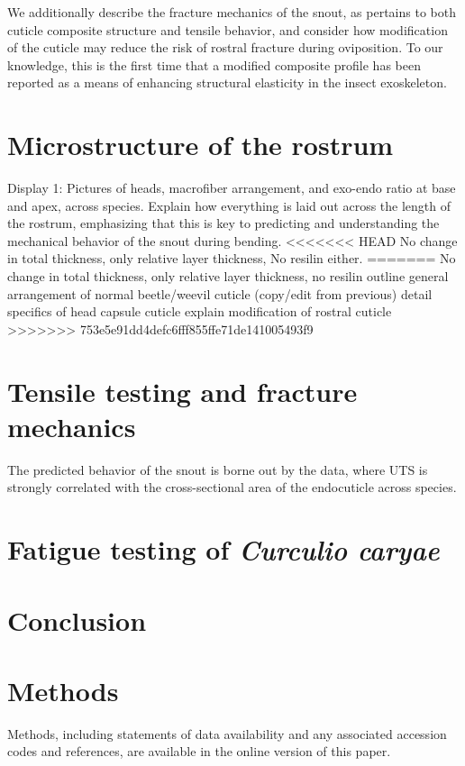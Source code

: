 \documentclass[twocolumn, linenumbers, superscriptaddress]{revtex4-1}
\begin{document}
	We additionally describe the fracture mechanics of the snout, as pertains to both cuticle composite structure and tensile behavior, and consider how modification of the cuticle may reduce the risk of rostral fracture during oviposition.
	To our knowledge, this is the first time that a modified composite profile has been reported as a means of enhancing structural elasticity in the insect exoskeleton.

	\section{Microstructure of the rostrum}\label{sec:microstructure} 
		Display 1: Pictures of heads, macrofiber arrangement, and exo-endo ratio at base and apex, across species.
		Explain how everything is laid out across the length of the rostrum, emphasizing that this is key to predicting and understanding the mechanical behavior of the snout during bending.
<<<<<<< HEAD
		No change in total thickness, only relative layer thickness,
		No resilin either.
=======
		No change in total thickness, only relative layer thickness, no resilin
		outline general arrangement of normal beetle/weevil cuticle (copy/edit from previous)
		detail specifics of head capsule cuticle 
		explain modification of rostral cuticle
>>>>>>> 753e5e91dd4defc6fff855ffe71de141005493f9
	
	\section{Tensile testing and fracture mechanics}
		The predicted behavior of the snout is borne out by the data, where UTS is strongly correlated with the cross-sectional area of the endocuticle across species.
		
	\section{Fatigue testing of \textit{Curculio caryae}}

	\section{Conclusion}

	\section{Methods}
		Methods, including statements of data availability and any associated accession codes and references, are available in the online version of this paper.
	
\end{document}
